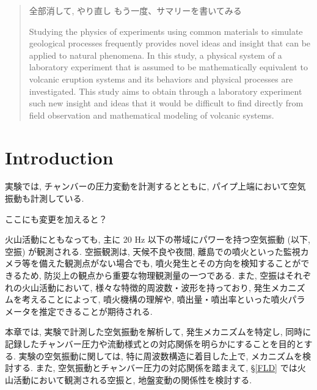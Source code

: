 \documentclass[12pt]{article}
\begin{document}
\linenumbers
\begin{abstract}
全部消して, やり直し
もう一度、サマリーを書いてみる


Studying the physics of experiments using common materials to simulate geological processes frequently provides novel ideas and insight that can be applied to natural phenomena.
In this study, a physical system of a laboratory experiment that is assumed to be mathematically equivalent to volcanic eruption systems and its behaviors and physical processes are investigated.
This study aims to obtain through a laboratory experiment such new insight and ideas that it would be difficult to find directly from field observation and mathematical modeling of volcanic systems.
\end{abstract} 



\newpage
\cleardoublepage


\section{Introduction}\label{ACOintro}
実験では, チャンバーの圧力変動を計測するとともに, パイプ上端において空気振動も計測している. 

ここにも変更を加えると？

火山活動にともなっても, 主に 20 Hz 以下の帯域にパワーを持つ空気振動 (以下, 空振) が観測される. 
空振観測は, 天候不良や夜間, 離島での噴火といった監視カメラ等を備えた観測点がない場合でも, 噴火発生とその方向を検知することができるため, 防災上の観点から重要な物理観測量の一つである.
また, 空振はそれぞれの火山活動において, 様々な特徴的周波数・波形を持っており, 発生メカニズムを考えることによって, 噴火機構の理解や, 噴出量・噴出率といった噴火パラメータを推定できることが期待される. 

本章では, 実験で計測した空気振動を解析して, 発生メカニズムを特定し, 同時に記録したチャンバー圧力や流動様式との対応関係を明らかにすることを目的とする. 実験の空気振動に関しては, 特に周波数構造に着目した上で, メカニズムを検討する. また, 空気振動とチャンバー圧力の対応関係を踏まえて, \S \ref{FLD} では火山活動において観測される空振と, 地盤変動の関係性を検討する.
\end{document}
